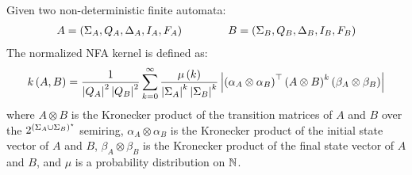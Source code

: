 \documentclass[12pt]{article}
\begin{document}
\begin{definition}
  Given two non-deterministic finite automata:
  \begin{align*}
    A = \left(\Sigma_A, Q_A, \Delta_A, I_A, F_A\right)
    \qquad \qquad
    B = \left(\Sigma_B, Q_B, \Delta_B, I_B, F_B\right)
  \end{align*}
  The normalized NFA kernel is defined as:
  \begin{align*}
  k\left(A, B\right)
    = \frac{1}{\left\lvert Q_A\right\rvert^2 \left\lvert Q_B\right\rvert^2}
        \sum_{k = 0}^{\infty}
          \frac{\mu\left(k\right)}{\left\lvert\Sigma_A\right\rvert^k \left\lvert\Sigma_B\right\rvert^k}
          \left\lvert\left(\alpha_A \otimes \alpha_B\right)^\top
            \left(A \otimes B\right)^k
            \left(\beta_A \otimes \beta_B\right)\right\rvert
  \end{align*}
  where
  \(A \otimes B\) is the Kronecker product of the transition matrices
  of \(A\) and \(B\) over the
  \(2^{\left(\Sigma_A \cup \Sigma_B\right)^\star}\) semiring,
  \(\alpha_A \otimes \alpha_B\) is the Kronecker product of the initial
  state vector of \(A\) and \(B\),
  \(\beta_A \otimes \beta_B\) is the Kronecker product of the final
  state vector of \(A\) and \(B\),
  and \(\mu\) is a probability distribution on \(\mathbb{N}\).
\end{definition}
\end{document}
